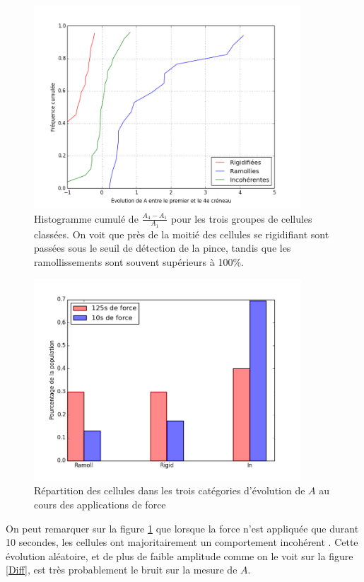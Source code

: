 \begin{figure}
\includegraphics[width=10cm]{Figures/Evolution_J4-J0_sur_J0.png} 
\caption{Histogramme cumulé de $\frac{A_4-A_1}{A_1}$ pour les trois groupes de cellules classées. On voit que près de la moitié des cellules se rigidifiant sont passées sous le seuil de détection de la pince, tandis que les ramollissements sont souvent supérieurs à 100\%.  }
\end{figure}

\begin{figure}
\includegraphics[width=10cm]{Figures/FRI_temoin_vs_C4.png} 
\caption{Répartition des cellules dans les trois catégories d'évolution de $A$ au cours des applications de force \label{FRI_temoin}}
\end{figure}

On peut remarquer sur la figure \ref{FRI_temoin} que lorsque la force n'est appliquée que durant 10 secondes, les cellules ont majoritairement un comportement incohérent .
Cette évolution aléatoire, et de plus de faible amplitude comme on le voit sur la figure \ref{Diff}, est très probablement le bruit sur la mesure de $A$. 

